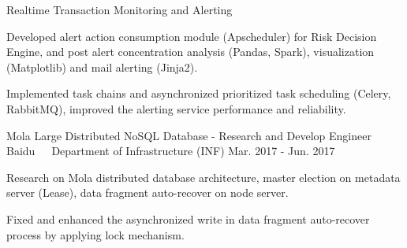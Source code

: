 \documentclass[11pt, a4paper, UTF8]{awesome-cv}
\begin{document}
\begin{cventries}
  \cventry
    {Realtime Transaction Monitoring and Alerting} %
    {} %
    {} %
    {\ } %
    {
      \begin{cvitems} %
        \item {Developed alert action consumption module (Apscheduler) for Risk Decision Engine, and post alert concentration analysis (Pandas, Spark), visualization (Matplotlib) and mail alerting (Jinja2).}
        \item {Implemented task chains and asynchronized prioritized task scheduling (Celery, RabbitMQ), improved the alerting service performance and reliability.}
      \end{cvitems}
    }
    
  \cventry
    {Mola Large Distributed NoSQL Database - Research and Develop Engineer} %
    {Baidu{\ \cdotp\ \ }Department of Infrastructure (INF)} %
    {Mar. 2017 - Jun. 2017} %
    {\ } %
    {
      \begin{cvitems} %
        \item {Research on Mola distributed database architecture, master election on metadata server (Lease), data fragment auto-recover on node server.}
        \item {Fixed and enhanced the asynchronized write in data fragment auto-recover process by applying lock mechanism.}
      \end{cvitems}
    }


\end{cventries}
\end{document}
